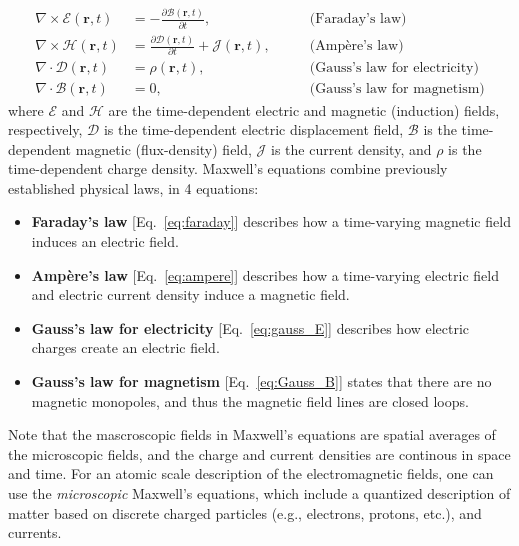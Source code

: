 \begin{align}
    \nabla \times \bm{\mathcal{E}} (\mathbf{r},t) &= - \frac{\partial \bm{\mathcal{B}}(\mathbf{r},t)}{\partial t}, \quad \quad &\text{(Faraday's law)} \label{eq:faraday}\\
    \nabla \times \bm{\mathcal{H}} (\mathbf{r},t) &= \frac{\partial \bm{\mathcal{D}}(\mathbf{r},t)}{\partial t} + \bm{\mathcal{J}}(\mathbf{r},t), \quad \quad &\text{(Ampère's law)} \label{eq:ampere}\\
    \nabla \cdot \bm{\mathcal{D}} (\mathbf{r},t) &= \mathcal{\rho}(\mathbf{r},t), \quad \quad &\text{(Gauss's law for electricity)} \label{eq:gauss_E}\\
    \nabla \cdot \bm{\mathcal{B}} (\mathbf{r},t) &= 0, \quad \quad &\text{(Gauss's law for magnetism)} \label{eq:Gauss_B}
\end{align}
where $\bm{\mathcal{E}}$ and $\bm{\mathcal{H}}$ are the time-dependent electric and magnetic (induction) fields, respectively, 
$\bm{\mathcal{D}}$ is the time-dependent electric displacement field,  
$\bm{\mathcal{B}}$ is the time-dependent magnetic (flux-density) field, $\bm{\mathcal{J}}$ is the current density,
and $\mathcal{\rho}$ is the time-dependent charge density. Maxwell's equations combine previously established
physical laws, in 4 equations:
\begin{itemize}
    \item \textbf{Faraday's law} [Eq.~\eqref{eq:faraday}] describes how a time-varying magnetic field induces an electric field.
    \item \textbf{Ampère's law} [Eq.~\eqref{eq:ampere}] describes how a time-varying electric field and electric current density induce a magnetic field.
    \item \textbf{Gauss's law for electricity} [Eq.~\eqref{eq:gauss_E}] describes how electric charges create an electric field. 
    \item \textbf{Gauss's law for magnetism} [Eq.~\eqref{eq:Gauss_B}] states that there are no magnetic monopoles, and thus the magnetic field lines are closed loops.
\end{itemize}

Note that the mascroscopic fields in Maxwell's equations 
are spatial averages of the
microscopic fields, and the charge and current densities are continous in space and time.
For an atomic scale description of the electromagnetic fields, one can use the \emph{microscopic}
Maxwell's equations, which include a quantized description of matter based on discrete charged particles
(e.g., electrons, protons, etc.), and currents.\\

